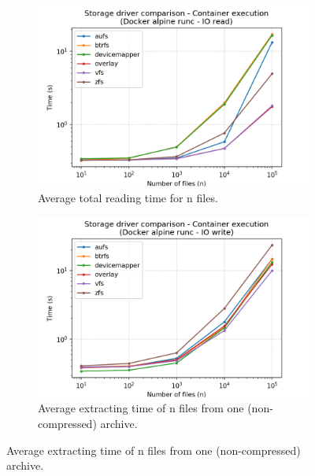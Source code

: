 \begin{figure}[!h]
    
    \begin{subfigure}{.5\textwidth}
      \centering
      \includegraphics[width=\linewidth]{images/storage-driver/storage-driver-execution-Docker-alpine-runc---IO-read.png}
      \caption{Average total reading time for n files.}
      \label{fig:storage-driver:io-read-exec}
    \end{subfigure}
    \begin{subfigure}{.5\textwidth}
      \centering
      \includegraphics[width=\linewidth]{images/storage-driver/storage-driver-execution-Docker-alpine-runc---IO-write.png}
      \caption{Average extracting time of n files from one (non-compressed) archive.}
      \label{fig:storage-driver:io-write-exec}
    \end{subfigure}
    

\end{figure}
